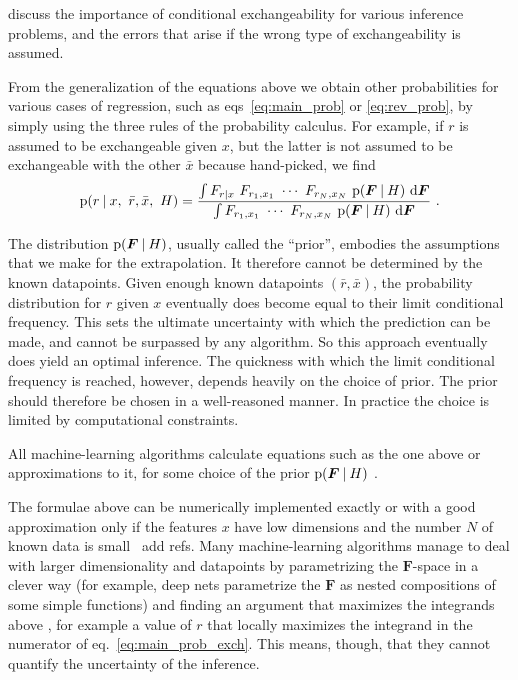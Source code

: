 \documentclass[\ifafour a4paper,12pt,\else a5paper,10pt,\fi%
onecolumn,oneside,article,%
british%
]{memoir}
\theoremstyle{remark}
\theoremstyle{innote}
\newcommand*{\di}{\mathrm{d}}%
\newcommand*{\p}{\mathrm{p}}%
\renewcommand*{\|}[1][]{\nonscript\:#1\vert\nonscript\:\mathopen{}}
\renewcommand*{\=}{\TextOrMath\texteq\eq}
\newcommand*{\eqn}{eq.}%
\newcommand*{\eqns}{eqs}%
\newcommand*{\wrench}{{\fontencoding{U}\fontfamily{fontawesomethree}\selectfont\symbol{114}}}
\newcommand{\mynote}[1]{ {\color{notecolour}#1}}
\newcommand*{\ro}{r}
\newcommand*{\xo}{x}
\newcommand*{\rd}{\bar{r}}
\newcommand*{\xd}{\bar{x}}
\newcommand*{\yF}{\bm{F}}
\begin{document}
\textcite{lindleyetal1981} discuss the importance of conditional
exchangeability for various inference problems, and the errors that arise
if the wrong type of exchangeability is assumed.

From the generalization of the equations above we obtain other
probabilities for various cases of regression, such as
\eqns~\eqref{eq:main_prob} or \eqref{eq:rev_prob}, by simply using the
three rules of the probability calculus. For example, if $\ro$ is assumed
to be exchangeable given $\xo$, but the latter is not assumed to be
exchangeable with the other $\xd$ because hand-picked, we find
\begin{equation}
  \label{eq:main_prob_exch}
  \p(\ro \| \xo,\ \rd,\xd,\ H) =
  \frac{
    \int F_{\ro\|\xo} \ F_{r_{1},x_{1}} \  \dotsm \ 
  F_{r_{N},x_{N}} \ \p(\yF \| H)\ \di\yF
  }{
    \int F_{r_{1},x_{1}} \  \dotsm \ 
  F_{r_{N},x_{N}} \ \p(\yF \| H)\ \di\yF
  } \ .
\end{equation}

The distribution $\p(\yF \| H)$, usually called the \enquote{prior},
embodies the assumptions that we make for the extrapolation. It therefore
cannot be determined by the known datapoints. Given enough known datapoints
$(\rd,\xd)$, the probability distribution for $\ro$ given $\xo$
eventually does become equal to their limit conditional frequency. This
sets the ultimate uncertainty with which the prediction can be made, and
cannot be surpassed by any algorithm. So this approach eventually does
yield an optimal inference. The quickness with which the limit conditional
frequency is reached, however, depends heavily on the choice of prior. The
prior should therefore be chosen in a well-reasoned manner. In practice the
choice is limited by computational constraints.

All machine-learning algorithms calculate equations such as the one above
or approximations to it, for some choice of the prior $\p(\yF \| H)$
\parencites{mackay1992,bishop2006}.

The formulae above can be numerically implemented exactly or with a good
approximation only if the features $x$ have low dimensions and the number
$N$ of known data is small \mynote{\wrench\ add refs}. Many
machine-learning algorithms manage to deal with larger dimensionality and
datapoints by parametrizing the $\yF$-space in a clever way (for example,
deep nets parametrize the $\yF$ as nested compositions of some simple
functions) and finding an argument that maximizes the integrands above
\parencites{mackay1992,mackay1992b}, for example a value of $\ro$ that
locally maximizes the integrand in the numerator of
\eqn~\eqref{eq:main_prob_exch}. This means, though, that they cannot
quantify the uncertainty of the inference.
\end{document}
